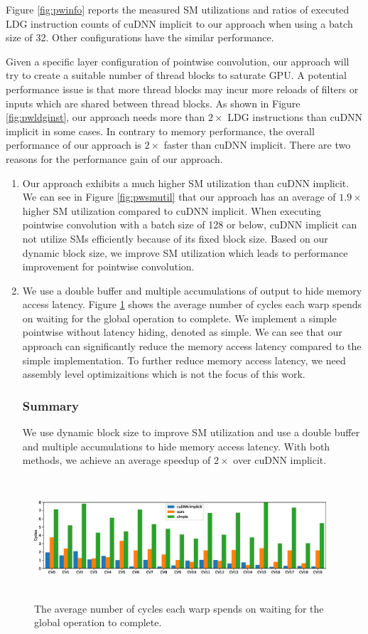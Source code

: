 Figure \ref{fig:pwinfo} reports the measured SM utilizations and ratios of executed LDG instruction counts of cuDNN implicit to our approach when using a batch size of 32. Other configurations have the similar performance. 

Given a specific layer configuration of pointwise convolution, our approach will try to create a suitable number of thread blocks to saturate GPU. 
A potential performance issue is that more thread blocks may incur more reloads of filters or inputs which are shared between thread blocks. 
As shown in Figure \ref{fig:pwldginst}, our approach needs more than $2\times$ LDG instructions than cuDNN implicit in some cases.
In contrary to memory performance, the overall performance of our approach is $2\times$ faster than cuDNN implicit.
There are two reasons for the performance gain of our approach. 
\begin{enumerate}
	\item Our approach exhibits a much higher SM utilization than cuDNN implicit.
	We can see in Figure \ref{fig:pwsmutil} that our approach has an average of $1.9\times$ higher SM utilization compared to cuDNN implicit.
	When executing pointwise convolution with a batch size of 128 or below, cuDNN implicit can not utilize SMs efficiently because of its fixed block size. 
	Based on our dynamic block size, we improve SM utilization which leads to performance improvement for pointwise convolution.
	\item We use a double buffer and multiple accumulations of output to hide memory access latency.
	Figure \ref{fig:stalllongscore} shows the average number of cycles each warp spends on waiting for the global operation to complete. 
	We implement a simple pointwise without latency hiding, denoted as simple. 
	We can see that our approach can significantly reduce the memory access latency compared to the simple implementation.
	To further reduce memory access latency, we need assembly level optimizaitions which is not the focus of this work.
\subsubsection{Summary} We use dynamic block size to improve SM utilization and use a double buffer and multiple accumulations to hide memory access latency. With both methods, we achieve an average speedup of $2\times$ over cuDNN implicit.
\end{enumerate}

\begin{figure}
    \centering
    \includegraphics[width=0.97\textwidth,height=4.5cm]{./figure/longscore.eps}
    \caption{The average number of cycles each warp spends on waiting for the global operation to complete.}
    \label{fig:stalllongscore}
\end{figure}

